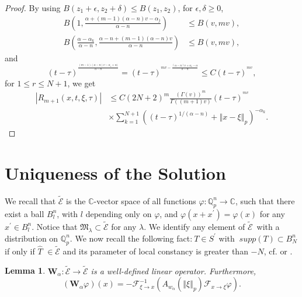 \documentclass{amsart}\usepackage{amsfonts}
\theoremstyle{plain}
\newtheorem{lemma}[theorem]{Lemma}
\numberwithin{equation}{section}
\begin{document}
\begin{proof}
By using $B(z_{1}+\epsilon,z_{2}+\delta)\leq B(z_{1},z_{2})$, for
$\epsilon,\delta\geq0$,\begin{align*}
B\left(  1,\frac{\alpha+(m-1)(\alpha-n)v-\alpha_{j}}{\alpha-n}\right)   &
\leq B\left(  v,mv\right)  ,\\
B\left(  \frac{\alpha-\alpha_{k}}{\alpha-n},\frac{\alpha-n+(m-1)(\alpha
-n)v}{\alpha-n}\right)   &  \leq B\left(  v,mv\right)  ,
\end{align*}
and\[
(t-\tau)^{^{\frac{(m-1)(\alpha-n)v-\alpha_{r}+\alpha)}{\alpha-n}}}=(t-\tau)^{^{mv-\frac{(\alpha-n)v+\alpha_{r}-\alpha}{\alpha-n}}}\leq
C(t-\tau)^{^{mv}},
\]
for $1\leq r\leq N+1$, we get\begin{align*}
\left\vert R_{m+1}(x,t,\xi,\tau)\right\vert  &  \leq C(2N+2)^{m}\frac{\left(
\Gamma(v)\right)  ^{m}}{\Gamma(\left(  m+1\right)  v)}(t-\tau)^{^{mv}}\\
&  \times{\displaystyle\sum\limits_{k=1}^{N+1}}
\left(  (t-\tau)^{1/(\alpha-n)}+\left\Vert x-\xi\right\Vert _{p}\right)
^{-\alpha_{k}}.
\end{align*}

\end{proof}

\section{\label{sect5}Uniqueness of the Solution}

We recall that $\widetilde{\mathcal{E}}$ is the $\mathbb{C}$-vector space of
all functions $\varphi:\mathbb{Q}_{p}^{n}\rightarrow\mathbb{C}$, such that
there exist a ball $B_{l}^{n}$, with $l$ depending only on $\varphi$, and
$\varphi\left(  x+x^{\prime}\right)  =\varphi\left(  x\right)  $ for any
$x^{\prime}\in B_{l}^{n}$. Notice that $\mathfrak{M}_{\lambda}\subset
\widetilde{\mathcal{E}}$ for any $\lambda$. We identify any element of
$\widetilde{\mathcal{E}}$\ with a distribution on $\mathbb{Q}_{p}^{n}$. We now
recall the following fact:$\ T\in S^{\prime}$ with $\ supp(T)\subset B_{N}^{n}$ if only if $\widehat{T}$ $\in\widetilde{\mathcal{E}}$ and its parameter
of local constancy is greater than $-N$, cf. \cite[pg 109]{V-V-Z} or
\cite[Proposition 3.17]{Taibleson}.

\begin{lemma}
\label{NewDomain} $\mathbf{W}_{\alpha}:\widetilde{\mathcal{E}}\rightarrow
\widetilde{\mathcal{E}}$ is a well-defined linear operator. Furthermore,\[
(\mathbf{W}_{\alpha}\varphi)(x)=-\mathcal{F}_{\xi\rightarrow x}^{-1}\left(
A_{w_{\alpha}}(\left\Vert \xi\right\Vert _{p})\mathcal{F}_{x\rightarrow\xi
}\varphi\right)  .
\]

\end{lemma}
\end{document}
